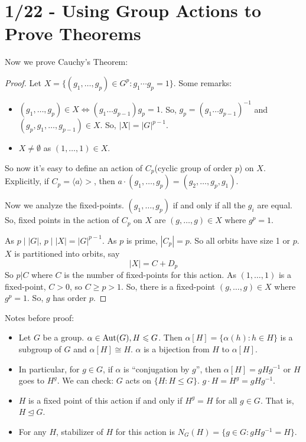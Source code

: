 \documentclass{report}
\begin{document}
\section{1/22 - Using Group Actions to Prove Theorems}
Now we prove Cauchy's Theorem:
\begin{proof}
    Let $X = \{ (g_1, \ldots, g_p) \in G^p : g_1 \cdots g_p = 1\}$. Some remarks:
    \begin{itemize}
        \item $(g_1, \ldots, g_p) \in X \iff (g_1\ldots g_{p-1})g_p = 1$. So, $g_p = (g_1\ldots g_{p-1})^{-1}$ and $(g_p, g_1, \ldots, g_{p-1}) \in X$. So, $|X| = |G|^{p-1}$.
        \item $X \neq \emptyset$ as $(1, \ldots, 1) \in X$.
    \end{itemize}
    So now it's easy to define an action of $C_p$(cyclic group of order $p$) on $X$. Explicitly, if $C_p = \langle a \rangle>$, then $a \cdot (g_1, \ldots, g_p) = (g_2, \ldots, g_p, g_1)$. 

    Now we analyze the fixed-points. $(g_1, \ldots, g_p)$ if and only if all the $g_i$ are equal. So, fixed points in the action of $C_p$ on $X$ are $(g, \ldots, g) \in X$ where $g^p = 1$. 

    As $p \mid |G|$, $p \mid |X| = |G|^{p-1}$. As $p$ is prime, $|C_p| = p$. So all orbits have size 1 or $p$. $X$ is partitioned into orbits, say $$|X| = C + D_p$$
    So $p | C$ where $C$ is the number of fixed-points for this action. As $(1, \ldots, 1)$ is a fixed-point, $C>0$, so $C \geq p > 1$. So, there is a fixed-point $(g, \ldots, g) \in X$ where $g^p = 1$. So, $g$ has order $p$.
\end{proof}
\noindent Notes before proof:
\begin{itemize}
    \item Let $G$ be a group. $\alpha \in \operatorname{Aut}(G), H\leqslant G$. Then $\alpha [H] = \{\alpha(h) : h \in H\}$ is a subgroup of $G$  and $\alpha[H] \cong H$. $\alpha$ is a bijection from $H$ to $\alpha[H]$. 
    \item In particular, for $g \in G$, if $\alpha$ is ``conjugation by $g$'', then $\alpha[H] = gHg^{-1}$ or $H$ goes to $H^g$. We can check: $G$ acts on $\{H : H \leq G\}$. $g\cdot H = H^g = gHg^{-1}$.
    \item $H$ is a fixed point of this action if and only if $H^g = H$ for all $g \in G$. That is, $H \trianglelefteq G$.
    \item For any $H$, stabilizer of $H$ for this action is $N_G(H) = \{g \in G : gHg^{-1} = H\}$.
\end{itemize}
\end{document}
